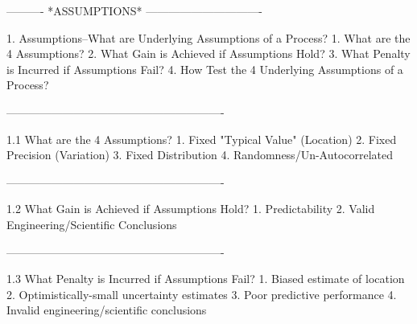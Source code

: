  
 
 
 
 
 
 
 
 
 
 
 
 
 
 
 
 
 
 
 
 
 
 
 
 
 
 
 
 
 
 
 
 
 
 
 
 
 
 
 
 
 
 
 
 
 
 
 
 
 
 
 
 
 
 
 
 
 
 
 
 
 
 
 
 
 
 
 
 
----------  *ASSUMPTIONS*  -------------------------------
 
1.
Assumptions--What are Underlying Assumptions of a Process?
   1. What are the 4 Assumptions?
   2. What Gain is Achieved if Assumptions Hold?
   3. What Penalty is Incurred if Assumptions Fail?
   4. How Test the 4 Underlying Assumptions of a Process?
 
----------------------------------------------------------
 
1.1
What are the 4 Assumptions?
   1. Fixed "Typical Value" (Location)
   2. Fixed Precision (Variation)
   3. Fixed Distribution
   4. Randomness/Un-Autocorrelated
 
----------------------------------------------------------
 
1.2
What Gain is Achieved if Assumptions Hold?
   1. Predictability
   2. Valid Engineering/Scientific Conclusions
 
----------------------------------------------------------
 
1.3
What Penalty is Incurred if Assumptions Fail?
   1. Biased estimate of location
   2. Optimistically-small uncertainty estimates
   3. Poor predictive performance
   4. Invalid engineering/scientific conclusions
 
